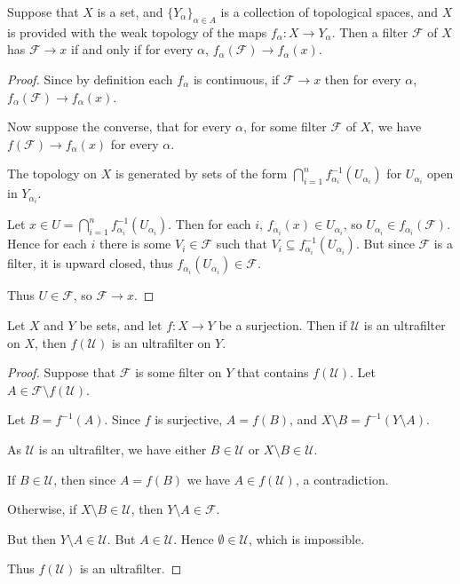 \begin{proposition}
    Suppose that $X$ is a set, and $\{Y_\alpha\}_{\alpha \in A}$
    is a collection of topological spaces, and $X$ is provided
    with the weak topology of the maps $f_\alpha:X\rightarrow Y_\alpha$.
    Then a filter $\mathcal{F}$ of $X$
    has $\mathcal{F}\rightarrow x$ if and only if for
    every $\alpha$, $f_\alpha(\mathcal{F})\rightarrow f_\alpha(x)$. 
\end{proposition}
\begin{proof}
    Since by definition each $f_\alpha$ is continuous, if $\mathcal{F}\rightarrow x$
    then for every $\alpha$, $f_\alpha(\mathcal{F})\rightarrow f_\alpha(x)$. 

    Now suppose the converse, that for every $\alpha$, 
    for some filter $\mathcal{F}$ of $X$, we have $f(\mathcal{F})\rightarrow f_\alpha(x)$
    for every $\alpha$. 

    The topology on $X$ is generated by sets of the form $\bigcap_{i=1}^n f_{\alpha_i}^{-1}(U_{\alpha_i})$
    for $U_{\alpha_i}$ open in $Y_{\alpha_i}$. 

    Let $x \in U = \bigcap_{i=1}^n f_{\alpha_i}^{-1}(U_{\alpha_i})$. Then 
    for each $i$, 
    $f_{\alpha_i}(x) \in U_{\alpha_i}$, 
    so $U_{\alpha_i} \in f_{\alpha_i}(\mathcal{F})$. Hence for each $i$
    there is some $V_i \in \mathcal{F}$
    such that $V_i \subseteq f_{\alpha_i}^{-1}(U_{\alpha_i})$.
    But since $\mathcal{F}$ is a filter,
    it is upward closed, thus $f_{\alpha_i}(U_{\alpha_{i}}) \in\mathcal{F}$.

    Thus $U \in \mathcal{F}$, so $\mathcal{F} \rightarrow x$. 
\end{proof}

\begin{proposition}
    Let $X$ and $Y$ be sets, and let $f:X\rightarrow Y$ be a surjection.
    Then if $\mathcal{U}$ is an ultrafilter on $X$, then $f(\mathcal{U})$
    is an ultrafilter on $Y$.
\end{proposition}
\begin{proof}
    Suppose that $\mathcal{F}$ is some filter on $Y$ 
    that contains $f(\mathcal{U})$. Let $A \in \mathcal{F}\setminus f(\mathcal{U})$. 

    Let $B = f^{-1}(A)$. Since $f$ is surjective, $A = f(B)$, and $X\setminus B = f^{-1}(Y\setminus A)$.

    As $\mathcal{U}$ is an ultrafilter, we have either $B \in \mathcal{U}$
    or $X\setminus B \in \mathcal{U}$.

    If $B \in \mathcal{U}$, then since $A = f(B)$ we have $A \in f(\mathcal{U})$,
    a contradiction.

    Otherwise, if $X\setminus B \in \mathcal{U}$, then $Y \setminus A \in \mathcal{F}$.

    But then $Y \setminus A \in \mathcal{U}$. But $A \in \mathcal{U}$.
    Hence $\emptyset \in \mathcal{U}$, which is impossible.

    Thus $f(\mathcal{U})$ is an ultrafilter.
\end{proof}

